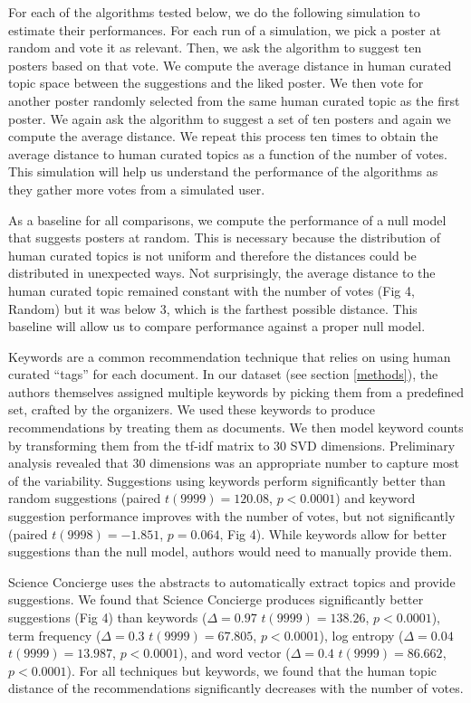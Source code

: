 \documentclass[a4paper]{article}
\begin{document}
For each of the algorithms tested below, we do the following simulation to estimate their performances. For each run of a simulation, we pick a poster at random and vote it as relevant. Then, we ask the algorithm to suggest ten posters based on that vote. We compute the average distance in human curated topic space between the suggestions and the liked poster. We then vote for another poster randomly selected from the same human curated topic as the first poster. We again ask the algorithm to suggest a set of ten posters and again we compute the average distance. We repeat this process ten times to obtain the average distance to human curated topics as a function of the number of votes. This simulation will help us understand the performance of the algorithms as they gather more votes from a simulated user.


As a baseline for all comparisons, we compute the performance of a null model that suggests posters at random. This is necessary because the distribution of human curated topics is not uniform and therefore the distances could be distributed in unexpected ways. Not surprisingly, the average distance to the human curated topic remained constant with the number of votes (Fig 4, Random) but it was below 3, which is the farthest possible distance. This baseline will allow us to compare performance against a proper null model.

Keywords are a common recommendation technique that relies on using human curated “tags” for each document. In our dataset (see section \ref{methods}), the authors themselves assigned multiple keywords by picking them from a predefined set, crafted by the organizers. We used these keywords to produce  recommendations by treating them as documents. We then model keyword counts by transforming them from the tf-idf matrix to 30 SVD dimensions. Preliminary analysis revealed that 30 dimensions was an appropriate number to capture most of the variability. Suggestions using keywords perform significantly better than random suggestions (paired $t(9999) = 120.08$, $p < 0.0001$) and keyword suggestion performance improves with the number of votes, but not significantly (paired $t(9998) = -1.851$, $p = 0.064$, Fig 4). While keywords allow for better suggestions than the null model, authors would need to manually provide them.


Science Concierge uses the abstracts to automatically extract topics and provide suggestions. We found that Science Concierge produces significantly better suggestions (Fig 4) than keywords ($\Delta = 0.97$ $t(9999) = 138.26$, $p < 0.0001$),
term frequency
($\Delta = 0.3$ $t(9999) = 67.805$, $p < 0.0001$),
log entropy
($\Delta = 0.04$ $t(9999) = 13.987$, $p < 0.0001$),
and word vector
($\Delta = 0.4$ $t(9999) = 86.662$, $p < 0.0001$). For all techniques but
keywords, we found that the human topic distance of the recommendations
significantly decreases with the number of votes.
\end{document}
